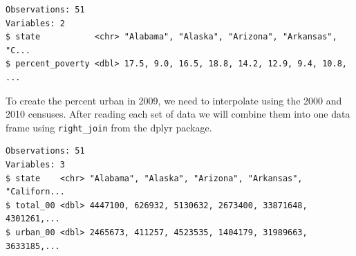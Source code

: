 \documentclass[]{book}
\newenvironment{Shaded}{\begin{snugshade}}{\end{snugshade}}
\newcommand{\CommentTok}[1]{\textcolor[rgb]{0.56,0.35,0.01}{\textit{#1}}}
\newcommand{\DataTypeTok}[1]{\textcolor[rgb]{0.13,0.29,0.53}{#1}}
\newcommand{\DecValTok}[1]{\textcolor[rgb]{0.00,0.00,0.81}{#1}}
\newcommand{\KeywordTok}[1]{\textcolor[rgb]{0.13,0.29,0.53}{\textbf{#1}}}
\newcommand{\NormalTok}[1]{#1}
\newcommand{\OperatorTok}[1]{\textcolor[rgb]{0.81,0.36,0.00}{\textbf{#1}}}
\newcommand{\StringTok}[1]{\textcolor[rgb]{0.31,0.60,0.02}{#1}}
\begin{document}
\begin{verbatim}
Observations: 51
Variables: 2
$ state           <chr> "Alabama", "Alaska", "Arizona", "Arkansas", "C...
$ percent_poverty <dbl> 17.5, 9.0, 16.5, 18.8, 14.2, 12.9, 9.4, 10.8, ...
\end{verbatim}

To create the percent urban in 2009, we need to interpolate using the 2000 and 2010 censuses. After reading each set of data we will combine them into one data frame using \texttt{right\_join} from the dplyr package.

\begin{Shaded}
\end{Shaded}

\begin{verbatim}
Observations: 51
Variables: 3
$ state    <chr> "Alabama", "Alaska", "Arizona", "Arkansas", "Californ...
$ total_00 <dbl> 4447100, 626932, 5130632, 2673400, 33871648, 4301261,...
$ urban_00 <dbl> 2465673, 411257, 4523535, 1404179, 31989663, 3633185,...
\end{verbatim}

\begin{Shaded}
\end{Shaded}
\end{document}

